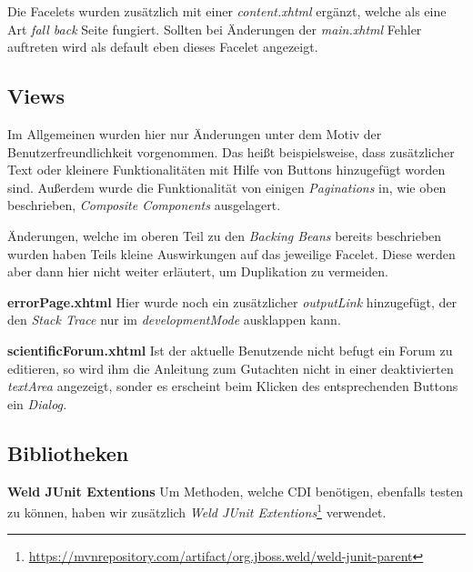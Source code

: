Die Facelets wurden zusätzlich mit einer \emph{content.xhtml} ergänzt, welche als eine Art \emph{fall back} Seite fungiert. Sollten  bei Änderungen der \emph{main.xhtml} Fehler auftreten wird als default eben dieses Facelet angezeigt.

\subsection{Views}

Im Allgemeinen wurden hier nur Änderungen unter dem Motiv der Benutzerfreundlichkeit vorgenommen. Das heißt beispielsweise, dass zusätzlicher Text oder kleinere Funktionalitäten mit Hilfe von Buttons hinzugefügt worden sind. Außerdem wurde die Funktionalität von einigen \emph{Paginations} in, wie oben beschrieben, \emph{Composite Components} ausgelagert.

Änderungen, welche im oberen Teil zu den \emph{Backing Beans} bereits beschrieben wurden haben Teils kleine Auswirkungen auf das jeweilige Facelet. Diese werden aber dann hier nicht weiter erläutert, um Duplikation zu vermeiden.

\textbf{errorPage.xhtml} Hier wurde noch ein zusätzlicher \emph{outputLink} hinzugefügt, der den \emph{Stack Trace} nur im \emph{developmentMode} ausklappen kann.

\textbf{scientificForum.xhtml} Ist der aktuelle Benutzende nicht befugt ein Forum zu editieren, so wird ihm die Anleitung zum Gutachten nicht in einer deaktivierten \emph{textArea} angezeigt, sonder es erscheint beim Klicken des entsprechenden Buttons ein \emph{Dialog.}

\subsection{Bibliotheken}

\textbf{Weld JUnit Extentions} Um Methoden, welche CDI benötigen, ebenfalls testen zu können, haben wir zusätzlich \emph{Weld JUnit Extentions}\footnote{\url{https://mvnrepository.com/artifact/org.jboss.weld/weld-junit-parent}} verwendet.



